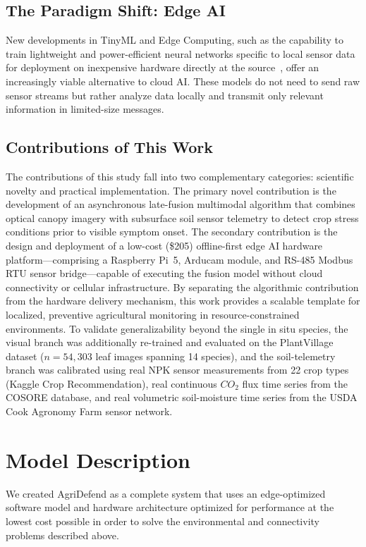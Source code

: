 \documentclass[10pt,twocolumn]{article}
\begin{document}
\subsection{The Paradigm Shift: Edge AI}
New developments in TinyML and Edge Computing, such as the capability to train lightweight and power-efficient neural networks specific to local sensor data for deployment on inexpensive hardware directly at the source~\cite{ref13}, offer an increasingly viable alternative to cloud AI.
These models do not need to send raw sensor streams but rather analyze data locally and transmit only relevant information in limited-size messages.

\subsection{Contributions of This Work}
The contributions of this study fall into two complementary categories: scientific novelty and practical implementation.
The primary novel contribution is the development of an asynchronous late-fusion multimodal algorithm that combines optical canopy imagery with subsurface soil sensor telemetry to detect crop stress conditions prior to visible symptom onset.
The secondary contribution is the design and deployment of a low-cost (\$205) offline-first edge AI hardware platform---comprising a Raspberry Pi~5, Arducam module, and RS-485 Modbus RTU sensor bridge---capable of executing the fusion model without cloud connectivity or cellular infrastructure.
By separating the algorithmic contribution from the hardware delivery mechanism, this work provides a scalable template for localized, preventive agricultural monitoring in resource-constrained environments.
To validate generalizability beyond the single in situ species, the visual branch was additionally re-trained and evaluated on the PlantVillage dataset ($n = 54{,}303$ leaf images spanning 14 species), and the soil-telemetry branch was calibrated using real NPK sensor measurements from 22 crop types (Kaggle Crop Recommendation), real continuous $CO_2$ flux time series from the COSORE database, and real volumetric soil-moisture time series from the USDA Cook Agronomy Farm sensor network.

\section{Model Description}
We created AgriDefend as a complete system that uses an edge-optimized software model and hardware architecture optimized for performance at the lowest cost possible in order to solve the environmental and connectivity problems described above.
\end{document}
